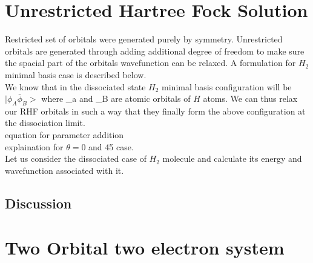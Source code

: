 \documentclass[11pt]{article}   	%
\begin{document}
\section{Unrestricted Hartree Fock Solution}
	Restricted set of orbitals were generated purely by symmetry. Unrestricted orbitals are generated through adding additional degree of freedom to make sure the spacial part of the orbitals wavefunction 
	can be relaxed. A formulation for $H_2$ minimal basis case is described below. \\
	We know that in the dissociated state $H_2$ minimal basis configuration will be $|\phi_A \bar{\phi}_B>$ where \phi_a and \phi_B are atomic orbitals of $H$ atoms. We can thus relax our RHF orbitals in such a way that they 
	finally form the above configuration at the dissociation limit. \\
	equation for parameter addition \\
	explaination for $\theta =0$ and 45 case. \\
	Let us consider the dissociated case of $H_2$ molecule and calculate its energy and wavefunction associated with it. \\
	
	\subsection{Discussion}
\section{Two Orbital two electron system}%
\end{document}
